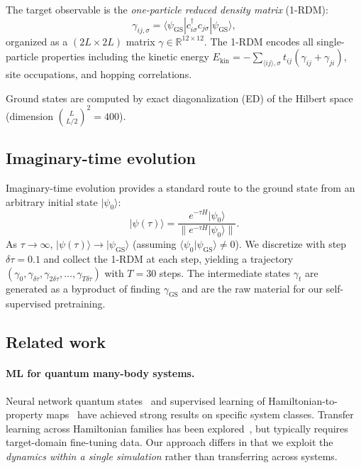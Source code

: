 \documentclass[12pt]{article}
\newcommand{\gam}{\gamma}
\newcommand{\gGS}{\gamma_{\mathrm{GS}}}
\newcommand{\dtau}{\delta\tau}
\begin{document}
The target observable is the \emph{one-particle reduced density matrix} (1-RDM):
\begin{equation}
  \gam_{ij,\sigma} = \langle \psi_{\mathrm{GS}} | c^\dagger_{i\sigma} c_{j\sigma} | \psi_{\mathrm{GS}} \rangle,
\label{eq:rdm}
\end{equation}
organized as a $(2L \times 2L)$ matrix $\gam \in \mathbb{R}^{12\times 12}$.
The 1-RDM encodes all single-particle properties including the kinetic energy
$E_\mathrm{kin} = -\sum_{\langle ij\rangle,\sigma} t_{ij}(\gam_{ij} + \gam_{ji})$,
site occupations, and hopping correlations.

Ground states are computed by exact diagonalization (ED) of the Hilbert space
(dimension $\binom{L}{L/2}^2 = 400$).

\subsection{Imaginary-time evolution}

Imaginary-time evolution provides a standard route to the ground state from an
arbitrary initial state $|\psi_0\rangle$:
\begin{equation}
  |\psi(\tau)\rangle = \frac{e^{-\tau H} |\psi_0\rangle}{\| e^{-\tau H} |\psi_0\rangle \|}.
\label{eq:imag_time}
\end{equation}
As $\tau \to \infty$, $|\psi(\tau)\rangle \to |\psi_{\mathrm{GS}}\rangle$ (assuming
$\langle\psi_0|\psi_{\mathrm{GS}}\rangle \neq 0$).
We discretize with step $\dtau = 0.1$ and collect the 1-RDM at each step,
yielding a trajectory $(\gam_0, \gam_{\dtau}, \gam_{2\dtau}, \ldots, \gam_{T\dtau})$
with $T=30$ steps.
The intermediate states $\gam_t$ are generated as a byproduct of finding $\gGS$
and are the raw material for our self-supervised pretraining.

\subsection{Related work}

\paragraph{ML for quantum many-body systems.}
Neural network quantum states~\citep{carleo2017solving} and supervised learning
of Hamiltonian-to-property maps~\citep{han2019solving, roth2023group} have achieved
strong results on specific system classes.
Transfer learning across Hamiltonian families has been explored~\citep{zen2020transfer},
but typically requires target-domain fine-tuning data.
Our approach differs in that we exploit the \emph{dynamics within a single simulation}
rather than transferring across systems.
\end{document}
